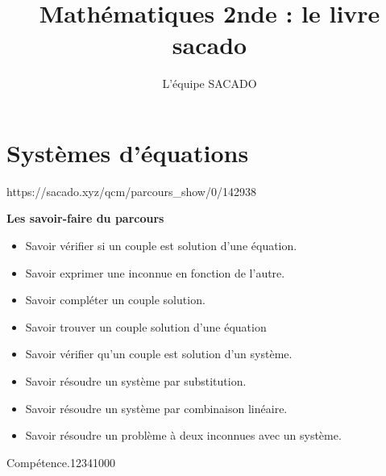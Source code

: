 



\title{Mathématiques 2nde  : le livre sacado}
\author{L'équipe SACADO}




\chapter{Systèmes d'équations}
{https://sacado.xyz/qcm/parcours_show/0/142938}
{
 \begin{CpsCol}
	\textbf{Les savoir-faire du parcours}
 	\begin{itemize}
 		\item Savoir vérifier si un couple est solution d'une équation.
		\item Savoir exprimer une inconnue en fonction de l'autre.
		\item Savoir compléter un couple solution.
		\item Savoir trouver un couple solution d'une équation
		\item Savoir vérifier qu'un couple est solution d'un système.
		\item Savoir résoudre un système par substitution.
		\item Savoir résoudre un système par combinaison linéaire.
		\item Savoir résoudre un problème à deux inconnues avec un système.
 	\end{itemize}
 \end{CpsCol}

\begin{His}
\end{His}

\begin{ExoDec}{Compétence.}{1234}{1}{0}{0}{0}
\end{ExoDec}
}


